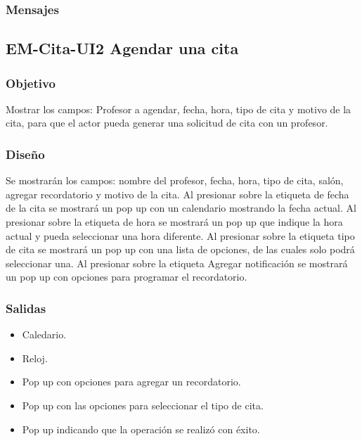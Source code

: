 \subsubsection{Mensajes}
\begin{Citemize}
	\item {}
\end{Citemize}


\pagebreak
\subsection{EM-Cita-UI2 Agendar una cita }

\subsubsection{Objetivo}
	\noindent
	Mostrar los campos: Profesor a agendar, fecha, hora, tipo de cita y
	motivo de la cita, para que el actor pueda generar una solicitud de cita con un profesor.

\subsubsection{Diseño}
	\noindent
	Se mostrarán los campos: nombre del profesor, fecha, hora, tipo de cita, salón, agregar recordatorio y
	motivo de la cita.
	 Al presionar sobre la etiqueta de fecha de la cita se mostrará un pop up con un
	calendario mostrando la fecha actual. Al presionar sobre la etiqueta de hora se mostrará un
	pop up que indique la hora actual y pueda seleccionar una hora diferente.
	Al presionar sobre la etiqueta tipo de cita se mostrará un pop up con una lista de opciones, de las
	cuales solo podrá seleccionar una. Al presionar sobre la etiqueta Agregar notificación se mostrará
	un pop up con opciones para programar el recordatorio.


\subsubsection{Salidas}
	\begin{itemize}
		\item Caledario.
		\item Reloj.
		\item Pop up con opciones para agregar un recordatorio.
		\item Pop up con las opciones para seleccionar el tipo de cita.
		\item Pop up indicando que la operación se realizó con éxito.
	\end{itemize}

